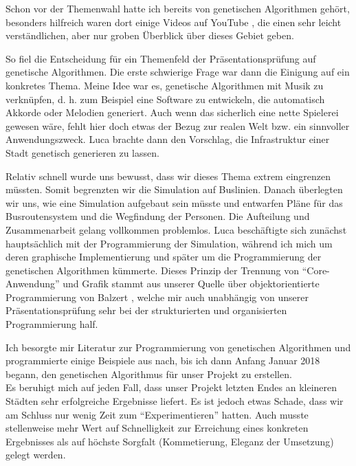 \documentclass[a4paper, 11pt]{scrartcl}
\begin{document}
Schon vor der Themenwahl hatte ich bereits von genetischen Algorithmen gehört, besonders hilfreich waren dort einige Videos auf YouTube \cite{carykh2015}, die einen sehr leicht verständlichen, aber nur groben Überblick über dieses Gebiet geben.

So fiel die Entscheidung für ein Themenfeld der Präsentationsprüfung auf genetische Algorithmen. Die erste schwierige Frage war dann die Einigung auf ein konkretes Thema. Meine Idee war es, genetische Algorithmen mit Musik zu verknüpfen, d. h. zum Beispiel eine Software zu entwickeln, die automatisch Akkorde oder Melodien generiert. Auch wenn das sicherlich eine nette Spielerei gewesen wäre, fehlt hier doch etwas der Bezug zur realen Welt bzw. ein sinnvoller Anwendungszweck. Luca brachte dann den Vorschlag, die Infrastruktur einer Stadt genetisch generieren zu lassen.

Relativ schnell wurde uns bewusst, dass wir dieses Thema extrem eingrenzen müssten. Somit begrenzten wir die Simulation auf Buslinien. Danach überlegten wir uns, wie eine Simulation aufgebaut sein müsste und entwarfen Pläne für das Busroutensystem und die Wegfindung der Personen. Die Aufteilung und Zusammenarbeit gelang vollkommen problemlos. Luca beschäftigte sich zunächst hauptsächlich mit der Programmierung der Simulation, während ich mich um deren graphische Implementierung und später um die Programmierung der genetischen Algorithmen kümmerte. Dieses Prinzip der Trennung von "`Core-Anwendung"' und Grafik stammt aus unserer Quelle über objektorientierte Programmierung von Balzert \cite{balzert2014}, welche mir auch unabhängig von unserer Präsentationsprüfung sehr bei der strukturierten und organisierten Programmierung half.

Ich besorgte mir Literatur zur Programmierung von genetischen Algorithmen \cite{selzam2006,jacobson2015} und programmierte einige Beispiele aus \cite{jacobson2015} nach, bis ich dann Anfang Januar 2018 begann, den genetischen Algorithmus für unser Projekt zu erstellen.\\

Es beruhigt mich auf jeden Fall, dass unser Projekt letzten Endes an kleineren Städten sehr erfolgreiche Ergebnisse liefert. Es ist jedoch etwas Schade, dass wir am Schluss nur wenig Zeit zum "`Experimentieren"' hatten. Auch musste stellenweise mehr Wert auf Schnelligkeit zur Erreichung eines konkreten Ergebnisses als auf höchste Sorgfalt (Kommetierung, Eleganz der Umsetzung) gelegt werden.
\end{document}
